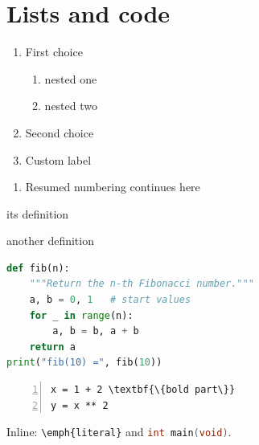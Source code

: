\documentclass[10pt]{article}
\begin{document}
\section*{Lists and code}
\begin{enumerate}
  \item First choice
    \begin{enumerate}
      \item nested one
      \item nested two
    \end{enumerate}
  \item Second choice\label{item:second}
  \item[\textsc{x}] Custom label
\end{enumerate}
\begin{enumerate}[resume,label=(\alph*)]
  \item Resumed numbering continues here
\end{enumerate}
\begin{description}[leftmargin=2cm,style=sameline,font=\sffamily\bfseries]
  \item[Term] its definition
  \item[Longer term] another definition
\end{description}

\begin{lstlisting}[language=Python,caption={Fibonacci},label=lst:fib]
def fib(n):
    """Return the n-th Fibonacci number."""
    a, b = 0, 1   # start values
    for _ in range(n):
        a, b = b, a + b
    return a
print("fib(10) =", fib(10))
\end{lstlisting}



\begin{Verbatim}[numbers=left,frame=lines,commandchars=\\\{\},fontsize=\small,label=Verbatim]
x = 1 + 2 \textbf{\{bold part\}}
y = x ** 2
\end{Verbatim}
Inline: \Verb|\emph{literal}| and \lstinline[language=C]|int main(void)|.
\end{document}
